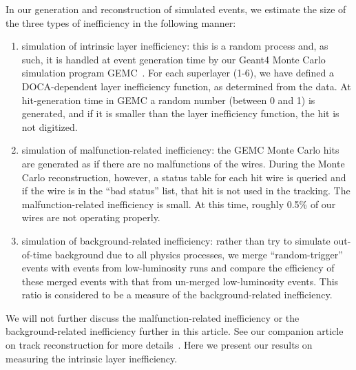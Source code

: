 In our generation and reconstruction of simulated events, we estimate the size of
the three types of inefficiency in the following manner:

\begin{enumerate}
\item simulation of intrinsic layer inefficiency: this is a random process
and, as such, it is handled at event generation time by our Geant4 Monte Carlo simulation
program GEMC~\cite{sim-nim}.  For each superlayer (1-6), we have defined a DOCA-dependent
layer inefficiency function, as determined from the data.  At hit-generation
time in GEMC a random number (between 0 and 1) is generated, and if it is
smaller than the layer inefficiency function, the hit is not digitized.
\item simulation of malfunction-related inefficiency: the GEMC Monte
Carlo hits are generated as if there are no malfunctions of the wires.
During the Monte Carlo reconstruction, however, a status table for each
hit wire is queried and if the wire is in the ``bad status'' list, that
hit is not used in the tracking. The malfunction-related inefficiency  is small.  
At this time, roughly 0.5\% of our wires are not operating properly.  
\item simulation of background-related inefficiency: rather than try
to simulate out-of-time background due to all physics processes, we merge
``random-trigger'' events with events from low-luminosity runs and compare the
efficiency of these merged events with that from un-merged low-luminosity events.
This ratio is considered to be a measure of the background-related inefficiency.
\end{enumerate}

We will not further discuss the malfunction-related inefficiency or
the background-related inefficiency further in this article.  See
our companion article on track reconstruction for more details~\cite{recon-nim}.
Here we present our results on measuring the intrinsic layer inefficiency.

